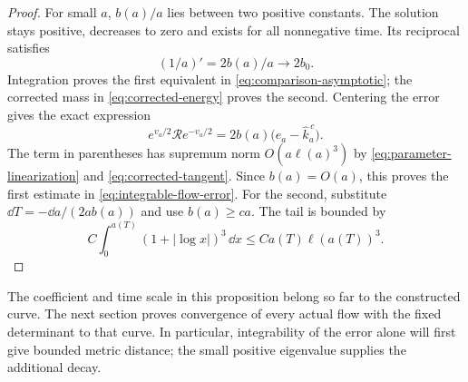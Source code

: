 \begin{proof}
For small \(a\), \(b(a)/a\) lies between two positive
constants. The solution stays positive, decreases to zero
and exists for all nonnegative time. Its reciprocal
satisfies
\[
 (1/a)'=2b(a)/a\longrightarrow2b_0.
\]
Integration proves the first equivalent in
\eqref{eq:comparison-asymptotic}; the corrected mass
in \eqref{eq:corrected-energy} proves the second.
Centering the error gives the exact expression
\[
 e^{v_a/2}\mathcal R e^{-v_a/2}
     =2b(a)\bigl(e_a-\widehat k_a^{\,c}\bigr).
\]
The term in parentheses has supremum norm
\(O(a\ell(a)^3)\) by
\eqref{eq:parameter-linearization} and
\eqref{eq:corrected-tangent}. Since \(b(a)=O(a)\),
this proves the first estimate in
\eqref{eq:integrable-flow-error}. For the second, substitute
\(\dd T=-\dd a/(2ab(a))\) and use \(b(a)\ge ca\).
The tail is bounded by
\[
 C\int_0^{a(T)}(1+|\log x|)^3\,\dd x
 \le Ca(T)\ell(a(T))^3.
\]
\end{proof}

The coefficient and time scale in this proposition belong so far
to the constructed curve. The next section proves convergence of
every actual flow with the fixed determinant to that curve. In
particular, integrability of the error alone will first give
bounded metric distance; the small positive eigenvalue supplies
the additional decay.
